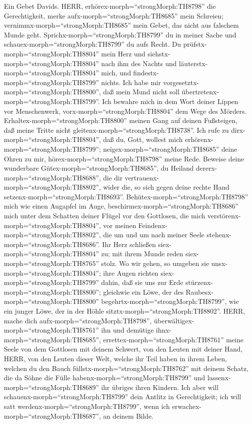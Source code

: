  Ein Gebet Davids. HERR,
erhörex-morph=``strongMorph:TH8798'' die Gerechtigkeit, merke
aufx-morph=``strongMorph:TH8685'' mein Schreien;
vernimmx-morph=``strongMorph:TH8685'' mein Gebet, das nicht aus falschem
Munde geht.  Sprichx-morph=``strongMorph:TH8799'' du in
meiner Sache und schauex-morph=``strongMorph:TH8799'' du aufs Recht.
 Du prüfstx-morph=``strongMorph:TH8804'' mein Herz und
siehstx-morph=``strongMorph:TH8804'' nach ihm des Nachts und
läuterstx-morph=``strongMorph:TH8804'' mich, und
findestx-morph=``strongMorph:TH8799'' nichts. Ich habe mir
vorgesetztx-morph=``strongMorph:TH8800'', daß mein Mund nicht soll
übertretenx-morph=``strongMorph:TH8799''.  Ich bewahre mich
in dem Wort deiner Lippen vor Menschenwerk,
vorx-morph=``strongMorph:TH8804'' dem Wege des Mörders. 
Erhaltex-morph=``strongMorph:TH8800'' meinen Gang auf deinen Fußsteigen,
daß meine Tritte nicht gleitenx-morph=``strongMorph:TH8738''.
 Ich rufe zu dirx-morph=``strongMorph:TH8804'', daß du,
Gott, wollest mich erhörenx-morph=``strongMorph:TH8799'';
neigex-morph=``strongMorph:TH8685'' deine Ohren zu mir,
hörex-morph=``strongMorph:TH8798'' meine Rede.  Beweise
deine wunderbare Gütex-morph=``strongMorph:TH8685'', du Heiland
dererx-morph=``strongMorph:TH8688'', die dir
vertrauenx-morph=``strongMorph:TH8802'', wider die, so sich gegen deine
rechte Hand setzenx-morph=``strongMorph:TH8693''. 
Behütex-morph=``strongMorph:TH8798'' mich wie einen Augapfel im Auge,
beschirmex-morph=``strongMorph:TH8686'' mich unter dem Schatten deiner
Flügel  vor den Gottlosen, die mich
verstörenx-morph=``strongMorph:TH8804'', vor meinen
Feindenx-morph=``strongMorph:TH8802'', die um und um nach meiner Seele
stehenx-morph=``strongMorph:TH8686''.  Ihr Herz schließen
siex-morph=``strongMorph:TH8804'' zu; mit ihrem Munde reden
siex-morph=``strongMorph:TH8765'' stolz.  Wo wir gehen, so
umgeben sie unsx-morph=``strongMorph:TH8804''; ihre Augen richten
siex-morph=``strongMorph:TH8799'' dahin, daß sie uns zur Erde
stürzenx-morph=``strongMorph:TH8800'';  gleichwie ein Löwe,
der des Raubesx-morph=``strongMorph:TH8800''
begehrtx-morph=``strongMorph:TH8799'', wie ein junger Löwe, der in der
Höhle sitztx-morph=``strongMorph:TH8802''.  HERR, mache
dich aufx-morph=``strongMorph:TH8798'',
überwältigex-morph=``strongMorph:TH8761'' ihn und demütige
ihnx-morph=``strongMorph:TH8685'', errettex-morph=``strongMorph:TH8761''
meine Seele von dem Gottlosen mit deinem Schwert,  von den
Leuten mit deiner Hand, HERR, von den Leuten dieser Welt, welche ihr
Teil haben in ihrem Leben, welchen du den Bauch
füllstx-morph=``strongMorph:TH8762'' mit deinem Schatz, die da Söhne die
Fülle habenx-morph=``strongMorph:TH8799'' und
lassenx-morph=``strongMorph:TH8689'' ihr übriges ihren Kindern.
 Ich aber will schauenx-morph=``strongMorph:TH8799'' dein
Antlitz in Gerechtigkeit; ich will satt
werdenx-morph=``strongMorph:TH8799'', wenn ich
erwachex-morph=``strongMorph:TH8687'', an deinem Bilde.

